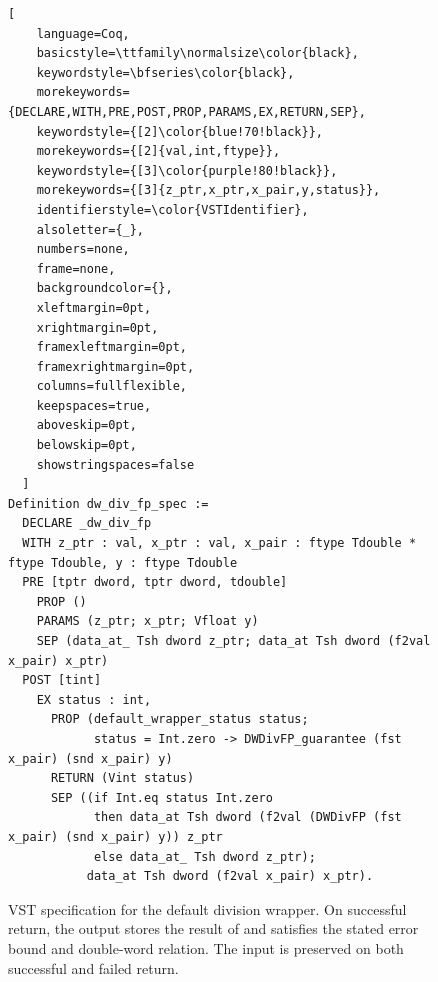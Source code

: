 \begin{figure}[t]
  \newsavebox{\dwdivfpspecbox}
  \begin{lrbox}{\dwdivfpspecbox}
  \begin{minipage}{\dimexpr\textwidth-2\fboxsep\relax}
  \begin{lstlisting}[
    language=Coq,
    basicstyle=\ttfamily\normalsize\color{black},
    keywordstyle=\bfseries\color{black},
    morekeywords={DECLARE,WITH,PRE,POST,PROP,PARAMS,EX,RETURN,SEP},
    keywordstyle={[2]\color{blue!70!black}},
    morekeywords={[2]{val,int,ftype}},
    keywordstyle={[3]\color{purple!80!black}},
    morekeywords={[3]{z_ptr,x_ptr,x_pair,y,status}},
    identifierstyle=\color{VSTIdentifier},
    alsoletter={_},
    numbers=none,
    frame=none,
    backgroundcolor={},
    xleftmargin=0pt,
    xrightmargin=0pt,
    framexleftmargin=0pt,
    framexrightmargin=0pt,
    columns=fullflexible,
    keepspaces=true,
    aboveskip=0pt,
    belowskip=0pt,
    showstringspaces=false
  ]
Definition dw_div_fp_spec :=
  DECLARE _dw_div_fp
  WITH z_ptr : val, x_ptr : val, x_pair : ftype Tdouble * ftype Tdouble, y : ftype Tdouble
  PRE [tptr dword, tptr dword, tdouble]
    PROP ()
    PARAMS (z_ptr; x_ptr; Vfloat y)
    SEP (data_at_ Tsh dword z_ptr; data_at Tsh dword (f2val x_pair) x_ptr)
  POST [tint]
    EX status : int,
      PROP (default_wrapper_status status;
            status = Int.zero -> DWDivFP_guarantee (fst x_pair) (snd x_pair) y)
      RETURN (Vint status)
      SEP ((if Int.eq status Int.zero
            then data_at Tsh dword (f2val (DWDivFP (fst x_pair) (snd x_pair) y)) z_ptr
            else data_at_ Tsh dword z_ptr);
           data_at Tsh dword (f2val x_pair) x_ptr).
\end{lstlisting}
  \end{minipage}
  \end{lrbox}
  \noindent\colorbox{gray!5}{\usebox{\dwdivfpspecbox}}
\caption{VST specification for the default
division wrapper. On successful return, the output stores the
result of \DWDivFP{} and satisfies the stated error bound and
double-word relation. The input is preserved on both successful
and failed return.}
  \label{fig:dw-div-fp-vst-spec}
\end{figure}
